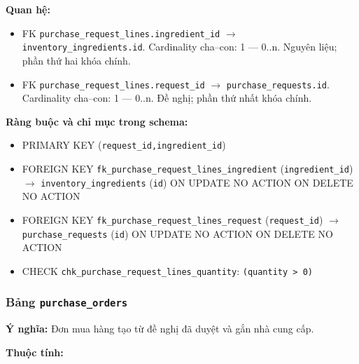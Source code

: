 \textbf{Quan hệ:}

\begin{itemize}

\item FK \texttt{purchase\_request\_lines.ingredient\_id} $\rightarrow$ \texttt{inventory\_ingredients.id}. Cardinality cha--con: 1 — 0..n. Nguyên liệu; phần thứ hai khóa chính.

\item FK \texttt{purchase\_request\_lines.request\_id} $\rightarrow$ \texttt{purchase\_requests.id}. Cardinality cha--con: 1 — 0..n. Đề nghị; phần thứ nhất khóa chính.

\end{itemize}

\textbf{Ràng buộc và chỉ mục trong schema:}

\begin{itemize}

\item PRIMARY KEY (\texttt{request\_id,ingredient\_id})

\item FOREIGN KEY \texttt{fk\_purchase\_request\_lines\_ingredient} (\texttt{ingredient\_id}) $\rightarrow$ \texttt{inventory\_ingredients} (\texttt{id}) ON UPDATE NO ACTION ON DELETE NO ACTION

\item FOREIGN KEY \texttt{fk\_purchase\_request\_lines\_request} (\texttt{request\_id}) $\rightarrow$ \texttt{purchase\_requests} (\texttt{id}) ON UPDATE NO ACTION ON DELETE NO ACTION

\item CHECK \texttt{chk\_purchase\_request\_lines\_quantity}: \texttt{(quantity > 0)}

\end{itemize}

\subsubsection{Bảng \texttt{purchase\_orders}}

\textbf{Ý nghĩa:} Đơn mua hàng tạo từ đề nghị đã duyệt và gắn nhà cung cấp.\par

\textbf{Thuộc tính:}

